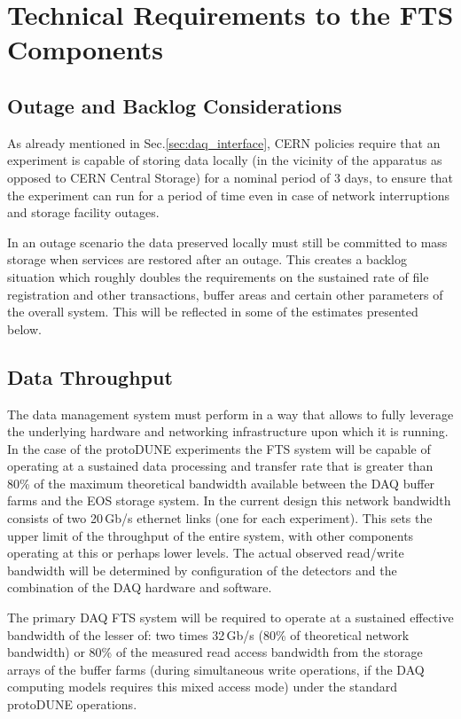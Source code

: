 \documentclass[12pt]{article}
\newcommand{\pd}{protoDUNE\xspace}
\begin{document}
 
\section{Technical Requirements to the FTS Components}

\subsection{Outage and Backlog Considerations}
\label{sec:backlog}
As already mentioned in Sec.\ref{sec:daq_interface},
CERN policies require that an experiment is capable of storing data locally (in the vicinity of the apparatus as opposed to CERN Central
Storage)  for a nominal period of 3 days, to ensure that the experiment can run for a period of time even in case of network interruptions
and storage facility outages.

In an outage scenario the data preserved locally must still be committed to mass storage when services are
restored after an outage. This creates a backlog situation which roughly doubles the requirements on the sustained
rate of file registration and other transactions, buffer areas and certain other parameters of the overall system.
This will be reflected in some of the estimates presented below.


\subsection{Data Throughput}

The data management system must perform in a way that allows to fully leverage the underlying hardware and networking infrastructure
upon which  it is running.  In the case of the \pd experiments the FTS system will be capable of operating at a sustained data processing and transfer
rate that is greater than 80\% of the maximum theoretical bandwidth available between the DAQ buffer farms and the EOS storage system.
In the current design this network bandwidth consists of two 20\,Gb/s ethernet links (one for each experiment).
This sets the upper limit of the throughput of the entire system, with other components operating at this or perhaps lower levels.
The actual observed read/write bandwidth will be determined by configuration of the detectors and the combination
of the DAQ hardware and software.


  The primary DAQ FTS system will be required to operate at a sustained effective bandwidth
of the lesser of: two times 32\,Gb/s (80\% of theoretical network bandwidth) or 80\% of the measured read access bandwidth from the storage arrays
of the buffer farms
(during simultaneous write operations, if the DAQ computing models requires this mixed access mode) under the standard \pd operations.
\end{document}
